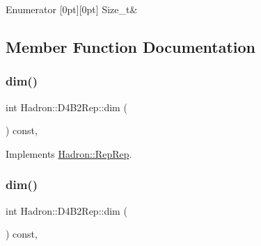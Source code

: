 \begin{DoxyEnumFields}{Enumerator}
[0pt][0pt]{}\mbox{\label{structHadron_1_1D4B2Rep_af2aa8c52969d647bc7a25be8fc40b6a5a97ac6905808810485fd79803205a0d7e}} 
Size\+\_\+t&\\
\hline

\end{DoxyEnumFields}


\subsection{Member Function Documentation}
\mbox{\label{structHadron_1_1D4B2Rep_a0a06eb2f05e5c89bb898a325aeff1793}} 
\subsubsection{\texorpdfstring{dim()}{dim()}\hspace{0.1cm}{\footnotesize\ttfamily [1/3]}}
{\footnotesize\ttfamily int Hadron\+::\+D4\+B2\+Rep\+::dim (\begin{DoxyParamCaption}{ }\end{DoxyParamCaption}) const\hspace{0.3cm}{\ttfamily [inline]}, {\ttfamily [virtual]}}



Implements \mbox{\hyperlink{structHadron_1_1RepRep_a92c8802e5ed7afd7da43ccfd5b7cd92b}{Hadron\+::\+Rep\+Rep}}.

\mbox{\label{structHadron_1_1D4B2Rep_a0a06eb2f05e5c89bb898a325aeff1793}} 
\subsubsection{\texorpdfstring{dim()}{dim()}\hspace{0.1cm}{\footnotesize\ttfamily [2/3]}}
{\footnotesize\ttfamily int Hadron\+::\+D4\+B2\+Rep\+::dim (\begin{DoxyParamCaption}{ }\end{DoxyParamCaption}) const\hspace{0.3cm}{\ttfamily [inline]}, {\ttfamily [virtual]}}



